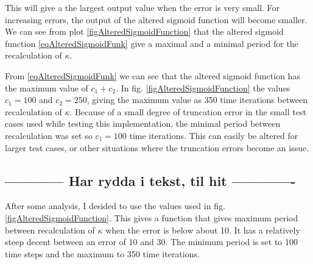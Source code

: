 		This will give a the largest output value when the error is very small. For increasing errors, the output of the altered sigmoid function will become smaller.
		We can see from plot \ref{figAlteredSigmoidFunction} that the altered sigmoid function \eqref{eqAlteredSigmoidFunk} give a maximal and a minimal period for the recalculation of $\kappa$.
	
		From \eqref{eqAlteredSigmoidFunk} we can see that the altered sigmoid function has the maximum value of $c_1+c_2$.
		In fig. \ref{figAlteredSigmoidFunction} the values $c_1 = 100$ and  $c_2 = 250$, giving the maximum value as 350 time iterations between recalculation of $\kappa$.
		Because of a small degree of truncation error in the small test cases used while testing this implementation, the minimal period between recalculation was set so $c_1=100$ time iterations. 
		This can easily be altered for larger test cases, or other situations where the truncation errors become an issue.

		


		\subsection{------------ Har rydda i tekst, til hit ------------- }

		After some analysis, I desided to use the values used in fig. \ref{figAlteredSigmoidFunction}.
		This gives a function that gives maximum period between recalculation of $\kappa$ when the error is below about 10. 
		It has a relatively steep decent between an error of 10 and 30. The minimum period is set to 100 time steps and the maximum to 350 time iterations.

